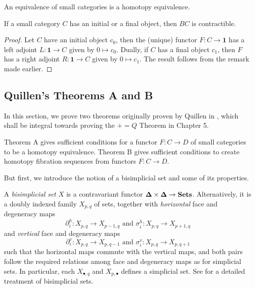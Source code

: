 \begin{corollary}
An equivalence of small categories is a homotopy equivalence.
\end{corollary}


\begin{proposition}
If a small category $C$ has an initial or a final object, then $BC$ is contractible.
\end{proposition}
\begin{proof}
Let $C$ have an initial object $c_0$, then the (unique) functor $F : C \to \mathbf 1$
has a left adjoint  $L : \mathbf 1 \to C$ given by $0 \mapsto c_0$.
Dually, if $C$ has a final object $c_1$, then $F$ has a right adjoint $R : \mathbf 1 \to C$ given by $0 \mapsto c_1$.
The result follows from the remark made earlier.
\end{proof}

\subsection{Quillen's Theorems A and B}

In this section, we prove two theorems originally proven by Quillen in \cite{Quillen1973},
which shall be integral towards proving the $+=Q$ Theorem in Chapter 5.

Theorem A gives sufficient conditions for a functor $F : C \to D$ of small categories to be 
a homotopy equivalence.
Theorem B gives sufficient conditions to create homotopy fibration sequences from
functors $F : C \to D$.

But first, we introduce the notion of a bisimplicial set and some of its properties.

\begin{definition}
A \emph{bisimplicial set} $X$ is a contravariant functor $\mathbf{\Delta} \times \mathbf{\Delta} \to \mathbf{Sets}$.
Alternatively, it is a doubly indexed family $X_{p,q}$ of sets, together with
\emph{horizontal} face and degeneracy maps
\[\partial^h_i : X_{p,q} \to X_{p-1,q} \text{ and } \sigma^h_i : X_{p,q} \to X_{p+1,q}\]
and \emph{vertical} face and degeneracy maps
\[\partial^v_i : X_{p,q} \to X_{p,q-1} \text{ and } \sigma^v_i : X_{p,q} \to X_{p,q+1}\]
such that the horizontal maps commute with the vertical maps, and both pairs follow
the required relations among face and degeneracy maps as for simplicial sets.
In particular, each $X_{\bullet,q}$ and $X_{p,\bullet}$ defines a simplicial set.
See \cite{Bousfield} for a detailed treatment of bisimplicial sets.
\end{definition}

